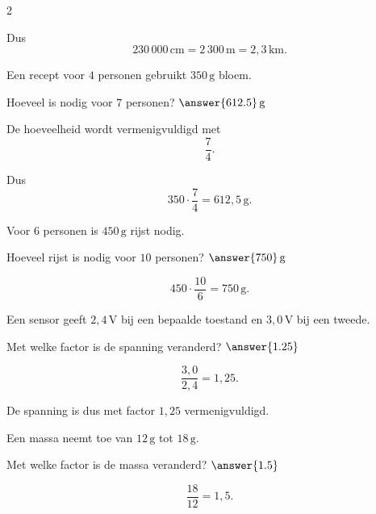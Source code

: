 \documentclass{ximera}
\begin{document}
\begin{oefening}[Verhoudingen]{\oefB}
\begin{multicols}{2}
\begin{question}
\begin{oplossing}
    Dus
    \[
    230\,000\,\mathrm{cm}
    =2\,300\,\mathrm m
    =2{,}3\,\mathrm{km}.
    \]
    \end{oplossing}
    \end{question}
    
    
    \begin{question}
    Een recept voor $4$ personen gebruikt $350\,\mathrm g$ bloem.
    
    Hoeveel is nodig voor $7$ personen? $\answer{612.5}\,\mathrm g$
    
    \begin{oplossing}
    De hoeveelheid wordt vermenigvuldigd met
    \[
    \dfrac74.
    \]
    
    Dus
    \[
    350\cdot\dfrac74
    =612{,}5\,\mathrm g.
    \]
    \end{oplossing}
    \end{question}
    
    
    \begin{question}
    Voor $6$ personen is $450\,\mathrm g$ rijst nodig.
    
    Hoeveel rijst is nodig voor $10$ personen? $\answer{750}\,\mathrm g$
    
    \begin{oplossing}
    \[
    450\cdot\dfrac{10}{6}
    =750\,\mathrm g.
    \]
    \end{oplossing}
    \end{question}
    
    
    \begin{question}
    Een sensor geeft $2{,}4\,\mathrm V$ bij een bepaalde toestand en $3{,}0\,\mathrm V$ bij een tweede.
    
    Met welke factor is de spanning veranderd? $\answer{1.25}$
    
    \begin{oplossing}
    \[
    \dfrac{3{,}0}{2{,}4}=1{,}25.
    \]
    
    De spanning is dus met factor $1{,}25$ vermenigvuldigd.
    \end{oplossing}
    \end{question}
    
    
    \begin{question}
    Een massa neemt toe van $12\,\mathrm g$ tot $18\,\mathrm g$.
    
    Met welke factor is de massa veranderd? $\answer{1.5}$
    
    \begin{oplossing}
    \[
    \dfrac{18}{12}=1{,}5.
    \]
    

\end{oplossing}
\end{question}
\end{multicols}
\end{oefening}
\end{document}
